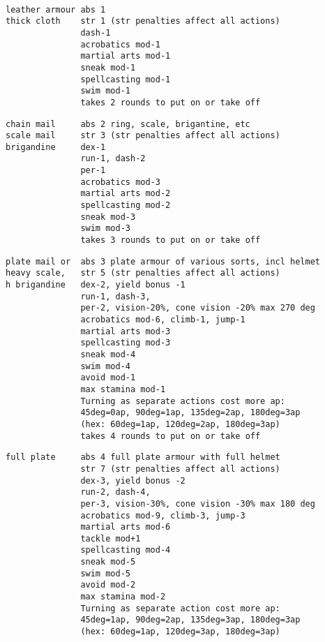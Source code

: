 \

\goodbreak \small \begin{samepage} \begin{verbatim}
leather armour abs 1
thick cloth    str 1 (str penalties affect all actions)
               dash-1
               acrobatics mod-1
               martial arts mod-1
               sneak mod-1
               spellcasting mod-1
               swim mod-1
               takes 2 rounds to put on or take off
\end{verbatim} \blocklistgap \begin{verbatim}
chain mail     abs 2 ring, scale, brigantine, etc
scale mail     str 3 (str penalties affect all actions)
brigandine     dex-1
               run-1, dash-2
               per-1
               acrobatics mod-3
               martial arts mod-2
               spellcasting mod-2
               sneak mod-3
               swim mod-3
               takes 3 rounds to put on or take off
\end{verbatim} \blocklistgap \begin{verbatim}
plate mail or  abs 3 plate armour of various sorts, incl helmet
heavy scale,   str 5 (str penalties affect all actions)
h brigandine   dex-2, yield bonus -1
               run-1, dash-3,
               per-2, vision-20%, cone vision -20% max 270 deg
               acrobatics mod-6, climb-1, jump-1
               martial arts mod-3
               spellcasting mod-3
               sneak mod-4
               swim mod-4
               avoid mod-1
               max stamina mod-1
               Turning as separate actions cost more ap:
               45deg=0ap, 90deg=1ap, 135deg=2ap, 180deg=3ap
               (hex: 60deg=1ap, 120deg=2ap, 180deg=3ap)
               takes 4 rounds to put on or take off
\end{verbatim} \blocklistgap \begin{verbatim}
full plate     abs 4 full plate armour with full helmet
               str 7 (str penalties affect all actions)
               dex-3, yield bonus -2
               run-2, dash-4,
               per-3, vision-30%, cone vision -30% max 180 deg
               acrobatics mod-9, climb-3, jump-3
               martial arts mod-6
               tackle mod+1
               spellcasting mod-4
               sneak mod-5
               swim mod-5
               avoid mod-2
               max stamina mod-2
               Turning as separate action cost more ap:
               45deg=1ap, 90deg=2ap, 135deg=3ap, 180deg=3ap
               (hex: 60deg=1ap, 120deg=3ap, 180deg=3ap)

\end{verbatim}
\end{samepage}
